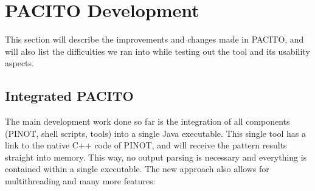 \section{PACITO Development}
\label{sec:pacito_dev}

This section will describe the improvements and changes made in PACITO, and will also list the difficulties we ran into while testing out the tool and its usability aspects.

\subsection{Integrated PACITO}
The main development work done so far is the integration of all components (PINOT, shell scripts, tools) into a single Java executable. This single tool has a link to the native C++ code of PINOT, and will receive the pattern results straight into memory. This way, no output parsing is necessary and everything is contained within a single executable. The new approach also allows for multithreading and many more features:
